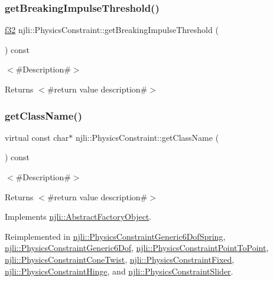 \subsubsection{\texorpdfstring{get\+Breaking\+Impulse\+Threshold()}{getBreakingImpulseThreshold()}}
{\footnotesize\ttfamily \mbox{\hyperlink{_util_8h_a5f6906312a689f27d70e9d086649d3fd}{f32}} njli\+::\+Physics\+Constraint\+::get\+Breaking\+Impulse\+Threshold (\begin{DoxyParamCaption}{ }\end{DoxyParamCaption}) const}

$<$\#\+Description\#$>$

\begin{DoxyReturn}{Returns}
$<$\#return value description\#$>$ 
\end{DoxyReturn}
\mbox{\label{classnjli_1_1_physics_constraint_a4d31c5267199972942d66b3480374010}} 
\subsubsection{\texorpdfstring{get\+Class\+Name()}{getClassName()}}
{\footnotesize\ttfamily virtual const char$\ast$ njli\+::\+Physics\+Constraint\+::get\+Class\+Name (\begin{DoxyParamCaption}{ }\end{DoxyParamCaption}) const\hspace{0.3cm}{\ttfamily [virtual]}}

$<$\#\+Description\#$>$

\begin{DoxyReturn}{Returns}
$<$\#return value description\#$>$ 
\end{DoxyReturn}


Implements \mbox{\hyperlink{classnjli_1_1_abstract_factory_object_af4151e41b80d5bc3fc42822c67fc2278}{njli\+::\+Abstract\+Factory\+Object}}.



Reimplemented in \mbox{\hyperlink{classnjli_1_1_physics_constraint_generic6_dof_spring_a8a44bad32336f595195ccfa836a91068}{njli\+::\+Physics\+Constraint\+Generic6\+Dof\+Spring}}, \mbox{\hyperlink{classnjli_1_1_physics_constraint_generic6_dof_a29b23a079a5d93600a701d7635fb26cd}{njli\+::\+Physics\+Constraint\+Generic6\+Dof}}, \mbox{\hyperlink{classnjli_1_1_physics_constraint_point_to_point_a98c21294338cec0671e817ff2c2afc2f}{njli\+::\+Physics\+Constraint\+Point\+To\+Point}}, \mbox{\hyperlink{classnjli_1_1_physics_constraint_cone_twist_af65735ee847bd4d4bc72978f52c238ec}{njli\+::\+Physics\+Constraint\+Cone\+Twist}}, \mbox{\hyperlink{classnjli_1_1_physics_constraint_fixed_ae6b9c4224d1dcc599a396385664b0ba0}{njli\+::\+Physics\+Constraint\+Fixed}}, \mbox{\hyperlink{classnjli_1_1_physics_constraint_hinge_a30edeca9b74147307de1440a37dac556}{njli\+::\+Physics\+Constraint\+Hinge}}, and \mbox{\hyperlink{classnjli_1_1_physics_constraint_slider_a6258ffd852a364064bfddb19669293c2}{njli\+::\+Physics\+Constraint\+Slider}}.

